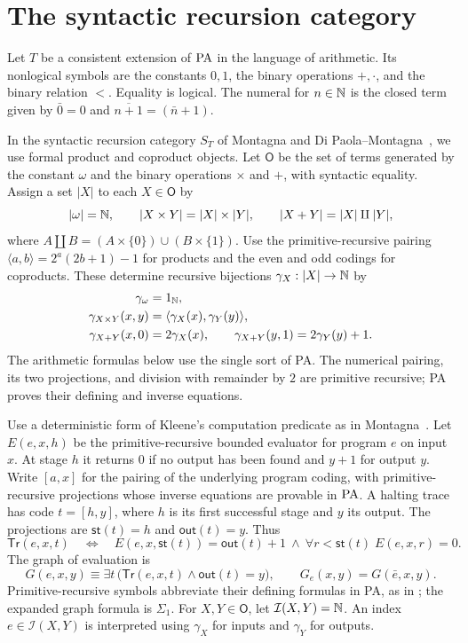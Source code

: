 \section{The syntactic recursion category}\label{sec:syntactic}

Let $T$ be a consistent extension of $\mathrm{PA}$ in the language of arithmetic.
Its nonlogical symbols are the constants $0,1$, the binary operations
$+,\cdot$, and the binary relation $<$. Equality is logical. The numeral for $n\in\mathbb N$ is the closed term
given by $\bar 0=0$ and $\overline{n+1}=(\bar n+1)$.

In the syntactic recursion category $S_T$ of Montagna and
Di Paola--Montagna~\cite{Montagna,DPM}, we use formal product and
coproduct objects. Let $\mathsf O$ be the set of terms generated
by the constant $\omega$ and the binary operations $\times$ and $+$,
with syntactic equality. Assign a set $|X|$ to each
$X\in\mathsf O$ by
\[
 |\omega|=\mathbb N,\qquad
 |X\times Y|=|X|\times|Y|,\qquad
 |X+Y|=|X|\amalg|Y|,
\]
where $A\amalg B=(A\times\{0\})\cup(B\times\{1\})$.
Use the primitive-recursive pairing
$\langle a,b\rangle=2^a(2b+1)-1$ for products and the even and
odd codings for coproducts. These determine recursive bijections
$\gamma_X:|X|\to\mathbb N$ by
\[
 \begin{aligned}
 \gamma_\omega&=1_\mathbb N,\\
 \gamma_{X\times Y}(x,y)
   &=\langle\gamma_X(x),\gamma_Y(y)\rangle,\\
 \gamma_{X+Y}(x,0)&=2\gamma_X(x),\qquad
 \gamma_{X+Y}(y,1)=2\gamma_Y(y)+1.
 \end{aligned}
\]
The arithmetic formulas below use the single sort of PA.
The numerical pairing, its two projections, and division with
remainder by $2$ are primitive recursive; PA proves their defining
and inverse equations.

Use a deterministic form of Kleene's computation predicate as in
Montagna~\cite[p.~115, Note~1]{Montagna}. Let $E(e,x,h)$ be the primitive-recursive bounded evaluator for program
$e$ on input $x$. At stage $h$ it returns $0$ if no output has been
found and $y+1$ for output $y$.
Write $[a,x]$ for the pairing of the underlying program coding, with
primitive-recursive projections whose inverse equations are provable
in $\mathrm{PA}$. A halting trace has code $t=[h,y]$, where $h$ is its
first successful stage and $y$ its output. The projections are
$\mathsf{st}(t)=h$ and $\mathsf{out}(t)=y$. Thus
\[
 \mathsf{Tr}(e,x,t)\quad\Longleftrightarrow\quad
 E(e,x,\mathsf{st}(t))=\mathsf{out}(t)+1
 \ \land\ \forall r<\mathsf{st}(t)\; E(e,x,r)=0.
\]
The graph of evaluation is
\[
 G(e,x,y)\equiv
 \exists t\,\bigl(\mathsf{Tr}(e,x,t)\land\mathsf{out}(t)=y\bigr),
 \qquad G_e(x,y)=G(\bar e,x,y).
\]
Primitive-recursive symbols abbreviate their defining formulas in
PA, as in \cite[p.~644]{DPM}; the expanded graph formula is $\Sigma_1$.
For $X,Y\in\mathsf O$, let $\mathcal I(X,Y)=\mathbb N$.
An index $e\in\mathcal I(X,Y)$ is interpreted using
$\gamma_X$ for inputs and $\gamma_Y$ for outputs.

